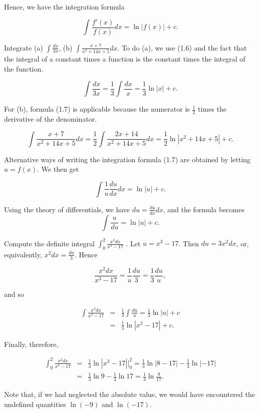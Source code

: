 Hence, we have the integration formula

\begin{theorem} %
$$
\int \frac{f'(x)}{f(x)}dx = \ln |f(x)| + c.
$$
\end{theorem}

\begin{example} Integrate (a) $\int \frac{dx}{3x}$, (b) $\int \frac{x + 7}{x^2 + 14x + 5} dx$. To do (a), we use (1.6) and the fact that the integral of a constant times a function is the constant times the integral of the function.

$$
\int \frac{dx}{3x} = \frac{1}{3} \int \frac{dx}{x} = \frac{1}{3} \ln |x| + c.
$$

\noindent For (b), formula (1.7) is applicable because the numerator is $\frac{1}{2}$ times the derivative of the denominator.

$$
\int \frac{x + 7}{x^2 + 14x + 5} dx = \frac{1}{2} \int \frac{2x + 14}{x^2 + 14x + 5} dx = \frac{1}{2} \ln |x^2 + 14x + 5| + c.
$$

Alternative ways of writing the integration formula (1.7) are obtained by letting $u = f(x)$. We then get

$$
\int \frac{1}{u} \frac{du}{dx} dx = \ln |u| + c .
$$

\noindent Using the theory of differentials, we have $du = \frac{du}{dx}dx$, and the formula becomes
$$
\int \frac{u}{du} = \ln |u| + c. 
$$
\end{example}

\begin{example} Compute the definite integral $\int_{0}^{2} \frac{x^{2}dx}{x^3 - 17}$ . Let $u = x^3 - 17$. Then $du = 3x^{2}dx$, or, equivalently, $x^2dx = \frac{du}{3}$. Hence 

$$
\frac{x^2 dx}{x^3 - 17} = \frac{1}{u} \frac{du}{3} = \frac{1}{3} \frac{du}{u},
$$

\noindent and so

\begin{eqnarray*}
\int \frac{x^2 dx}{x^3 - 17} &=& \frac{1}{3} \int \frac{du}{u} = \frac{1}{3} \ln |u| + c\\
                                          &=& \frac{1}{3} \ln | x^3 - 17 | + c.
\end{eqnarray*}

\noindent Finally, therefore, 

\begin{eqnarray*}
\int_{0}^{2} \frac{x^{2}dx}{x^{3} - 17} 
&=& \frac{1}{3} \ln |x^3 - 17| \Big|_{0}^{2}  
= \frac{1}{3} \ln |8 - 17| - \frac{1}{3} \ln |-17| \\ 
&=& \frac{1}{3} \ln 9 - \frac{1}{3} \ln 17 = \frac{1}{3} \ln \frac{9}{17}. 
\end{eqnarray*}

\noindent Note that, if we had neglected the absolute value, we would have encountered the undefined quantities $\ln(- 9)$ and $\ln( - 17)$.
\end{example}
\medskip


